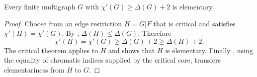 \begin{lemma}
Every finite multigraph $G$ with
$\chi'(G)\ge\Delta(G)+2$ is elementary.
\end{lemma}
\begin{proof}
Choose from  an edge restriction $H=G|F$ that
is critical and satisfies $\chi'(H)=\chi'(G)$.  By
, $\Delta(H)\le\Delta(G)$.  Therefore
\[
 \chi'(H)=\chi'(G)\ge\Delta(G)+2\ge\Delta(H)+2.
\]
The critical theorem  applies to $H$ and shows that $H$ is
elementary.  Finally , using the equality of
chromatic indices supplied by the critical core, transfers elementariness
from $H$ to $G$.
\end{proof}
